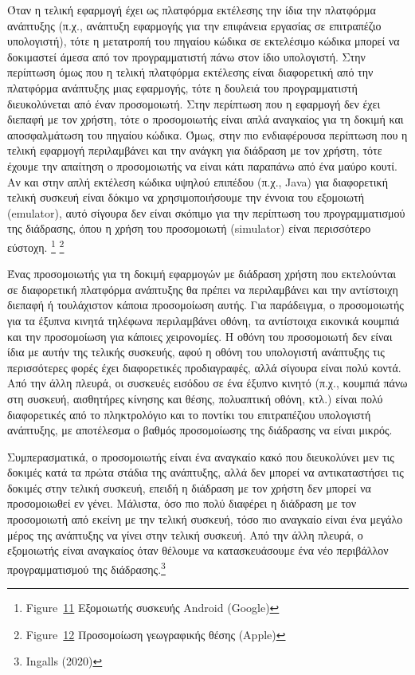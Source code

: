 \documentclass[
]{article}
\begin{document}
Όταν η τελική εφαρμογή έχει ως πλατφόρμα εκτέλεσης την ίδια την
πλατφόρμα ανάπτυξης (π.χ., ανάπτυξη εφαρμογής για την επιφάνεια εργασίας
σε επιτραπέζιο υπολογιστή), τότε η μετατροπή του πηγαίου κώδικα σε
εκτελέσιμο κώδικα μπορεί να δοκιμαστεί άμεσα από τον προγραμματιστή πάνω
στον ίδιο υπολογιστή. Στην περίπτωση όμως που η τελική πλατφόρμα
εκτέλεσης είναι διαφορετική από την πλατφόρμα ανάπτυξης μιας εφαρμογής,
τότε η δουλειά του προγραμματιστή διευκολύνεται από έναν προσομοιωτή.
Στην περίπτωση που η εφαρμογή δεν έχει διεπαφή με τον χρήστη, τότε ο
προσομοιωτής είναι απλά αναγκαίος για τη δοκιμή και αποσφαλμάτωση του
πηγαίου κώδικα. Όμως, στην πιο ενδιαφέρουσα περίπτωση που η τελική
εφαρμογή περιλαμβάνει και την ανάγκη για διάδραση με τον χρήστη, τότε
έχουμε την απαίτηση ο προσομοιωτής να είναι κάτι παραπάνω από ένα μαύρο
κουτί. Αν και στην απλή εκτέλεση κώδικα υψηλού επιπέδου (π.χ., Java) για
διαφορετική τελική συσκευή είναι δόκιμο να χρησιμοποιήσουμε την έννοια
του εξομοιωτή (emulator), αυτό σίγουρα δεν είναι σκόπιμο για την
περίπτωση του προγραμματισμού της διάδρασης, όπου η χρήση του
προσομοιωτή (simulator) είναι περισσότερο εύστοχη. \footnote{Figure~\protect\hyperlink{fig:android-emulator}{11}
  Εξομοιωτής συσκευής Android (Google)} \footnote{Figure~\protect\hyperlink{fig:geolocation-simulation}{12}
  Προσομοίωση γεωγραφικής θέσης (Apple)}

Ένας προσομοιωτής για τη δοκιμή εφαρμογών με διάδραση χρήστη που
εκτελούνται σε διαφορετική πλατφόρμα ανάπτυξης θα πρέπει να περιλαμβάνει
και την αντίστοιχη διεπαφή ή τουλάχιστον κάποια προσομοίωση αυτής. Για
παράδειγμα, ο προσομοιωτής για τα έξυπνα κινητά τηλέφωνα περιλαμβάνει
οθόνη, τα αντίστοιχα εικονικά κουμπιά και την προσομοίωση για κάποιες
χειρονομίες. Η οθόνη του προσομοιωτή δεν είναι ίδια με αυτήν της τελικής
συσκευής, αφού η οθόνη του υπολογιστή ανάπτυξης τις περισσότερες φορές
έχει διαφορετικές προδιαγραφές, αλλά σίγουρα είναι πολύ κοντά. Από την
άλλη πλευρά, οι συσκευές εισόδου σε ένα έξυπνο κινητό (π.χ., κουμπιά
πάνω στη συσκευή, αισθητήρες κίνησης και θέσης, πολυαπτική οθόνη, κτλ.)
είναι πολύ διαφορετικές από το πληκτρολόγιο και το ποντίκι του
επιτραπέζιου υπολογιστή ανάπτυξης, με αποτέλεσμα ο βαθμός προσομοίωσης
της διάδρασης να είναι μικρός.

Συμπερασματικά, ο προσομοιωτής είναι ένα αναγκαίο κακό που διευκολύνει
μεν τις δοκιμές κατά τα πρώτα στάδια της ανάπτυξης, αλλά δεν μπορεί να
αντικαταστήσει τις δοκιμές στην τελική συσκευή, επειδή η διάδραση με τον
χρήστη δεν μπορεί να προσομοιωθεί εν γένει. Μάλιστα, όσο πιο πολύ
διαφέρει η διάδραση με τον προσομοιωτή από εκείνη με την τελική συσκευή,
τόσο πιο αναγκαίο είναι ένα μεγάλο μέρος της ανάπτυξης να γίνει στην
τελική συσκευή. Από την άλλη πλευρά, ο εξομοιωτής είναι αναγκαίος όταν
θέλουμε να κατασκευάσουμε ένα νέο περιβάλλον προγραμματισμού της
διάδρασης.\footnote{Ingalls (2020)}
\end{document}
